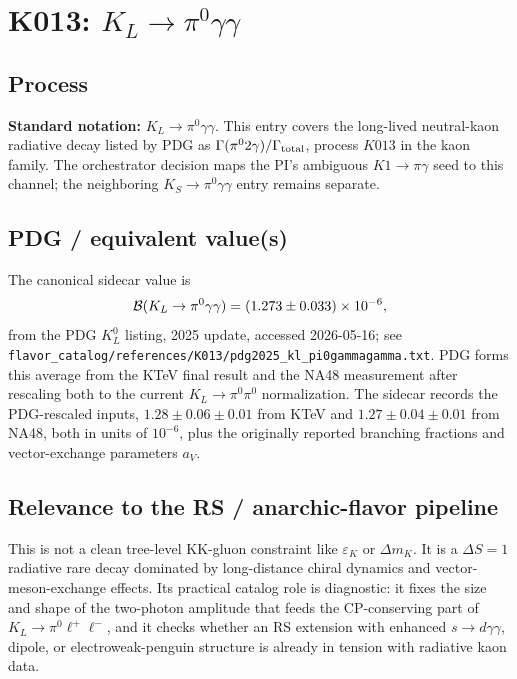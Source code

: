 
\section{K013: \(K_L \to \pi^0\gamma\gamma\)}

\subsection*{Process}
\textbf{Standard notation:} \(K_L \to \pi^0\gamma\gamma\).  This entry covers
the long-lived neutral-kaon radiative decay listed by PDG as
\(\Gamma(\pi^0 2\gamma)/\Gamma_{\rm total}\), process \(K013\) in the kaon
family.  The orchestrator decision maps the PI's ambiguous
\(K1\to\pi\gamma\) seed to this channel; the neighboring
\(K_S\to\pi^0\gamma\gamma\) entry remains separate.

\subsection*{PDG / equivalent value(s)}
The canonical sidecar value is
\[
  {\cal B}(K_L\to\pi^0\gamma\gamma)=(1.273\pm0.033)\times10^{-6},
\]
from the PDG \(K_L^0\) listing, 2025 update, accessed 2026-05-16; see
\texttt{flavor\_catalog/references/K013/pdg2025\_kl\_pi0gammagamma.txt}.
PDG forms this average from the KTeV final result and the NA48 measurement
after rescaling both to the current \(K_L\to\pi^0\pi^0\) normalization.  The
sidecar records the PDG-rescaled inputs, \(1.28\pm0.06\pm0.01\) from KTeV and
\(1.27\pm0.04\pm0.01\) from NA48, both in units of \(10^{-6}\), plus the
originally reported branching fractions and vector-exchange parameters \(a_V\).

\subsection*{Relevance to the RS / anarchic-flavor pipeline}
This is not a clean tree-level KK-gluon constraint like \(\varepsilon_K\) or
\(\Delta m_K\).  It is a \(\Delta S=1\) radiative rare decay dominated by
long-distance chiral dynamics and vector-meson-exchange effects.  Its practical
catalog role is diagnostic: it fixes the size and shape of the two-photon
amplitude that feeds the CP-conserving part of
\(K_L\to\pi^0\ell^+\ell^-\), and it checks whether an RS extension with
enhanced \(s\to d\gamma\gamma\), dipole, or electroweak-penguin structure is
already in tension with radiative kaon data.

